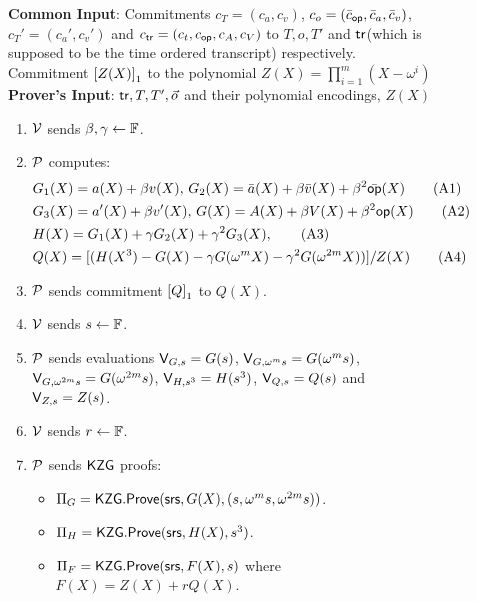 \begin{figure}[htbp]

    \begin{mdframed}
    {
            {\bf Common Input}: Commitments $c_T=(c_a,c_v)$, $c_o=(\bar{c}_\op, \bar{c}_a, \bar{c}_v)$, $c_T'=(c_a', c_v')$
        and $c_\tr=(c_t, c_\op, c_A, c_V)$ to $T,o,T'$ and $\tr$(which is supposed to be the time ordered transcript) respectively. Commitment $\gone{Z(X)}$ to the polynomial
        $Z(X)=\prod_{i=1}^m (X-\omega^i)$\\
    {\bf Prover's Input}: $\tr, T, T', \vec{o}$ and their polynomial encodings, $Z(X)$
        \begin{enumerate}[leftmargin=1em, label=\arabic*.]
            \item $\verifier$ sends $\beta,\gamma\gets \F$.
            \item $\prover$ computes:
            \begin{align}\label{eq:poly-constraints}
            & G_1(X) = a(X) + \beta v(X),\, G_2(X) = \bar{a}(X) + \beta \bar{v}(X) + \beta^2 \bar{\op}(X) \tag{A1} \\
            & G_3(X) = a'(X) + \beta v'(X),\, G(X) = A(X) + \beta V(X) + \beta^2 \op(X) \tag{A2} \\
            & H(X) = G_1(X) + \gamma G_2(X) + \gamma^2 G_3(X), \tag{A3} \\
            & Q(X) = [(H(X^3) - G(X) - \gamma G(\omega^m X) - \gamma^2 G(\omega^{2m} X))]/Z(X) \tag{A4}
            \end{align}
            \item $\prover$ sends commitment $\gone{Q}$ to $Q(X)$.
            \item $\verifier$ sends $s\gets\F$.
            \item $\prover$ sends evaluations $\val{s}{G}=G(s)$, $\val{\omega^m s}{G}=G(\omega^m s)$,
            $\val{\omega^{2m}s}{G}=G(\omega^{2m} s)$, $\val{s^3}{H}=H(s^3)$, $\val{s}{Q}=Q(s)$ and $\val{s}{Z}=Z(s)$.
            \item $\verifier$ sends $r\gets\F$.
            \item $\prover$ sends $\kzg$ proofs:
            \begin{itemize}[leftmargin=1em]
                \item $\Pi_G=\kzgprove(\srs,G(X),(s,\omega^m s, \omega^{2m}s))$.
                \item $\Pi_H=\kzgprove(\srs,H(X),s^3)$.
                \item $\Pi_F=\kzgprove(\srs,F(X),s)$ where $F(X)=Z(X) + rQ(X)$.

\end{itemize}
\end{enumerate}}
\end{mdframed}
\end{figure}
